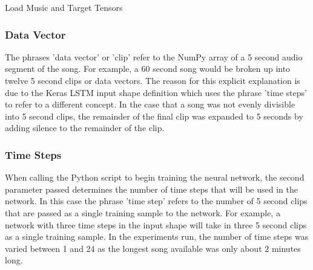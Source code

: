         \begin{algorithm}[h]
        \caption{Load Music and Target Tensors}
        \label{alg:load-music}
        \end{algorithm}
     
        \subsubsection{Data Vector}
        The phrases 'data vector' or 'clip' refer to the NumPy array of a 5 second audio segment of the song. For example, a 60 second song would be broken up into twelve 5 second clips or data vectors. The reason for this explicit explanation is due to the Keras LSTM input shape definition which uses the phrase 'time steps' to refer to a different concept. In the case that a song was not evenly divisible into 5 second clips, the remainder of the final clip was expanded to 5 seconds by adding silence to the remainder of the clip.
        \subsubsection{Time Steps}
        When calling the Python script to begin training the neural network, the second parameter passed determines the number of time steps that will be used in the network. In this case the phrase 'time step' refers to the number of 5 second clips that are passed as a single training sample to the network. For example, a network with three time steps in the input shape will take in three 5 second clips as a single training sample. In the experiments run, the number of time steps was varied between 1 and 24 as the longest song available was only about 2 minutes long.
